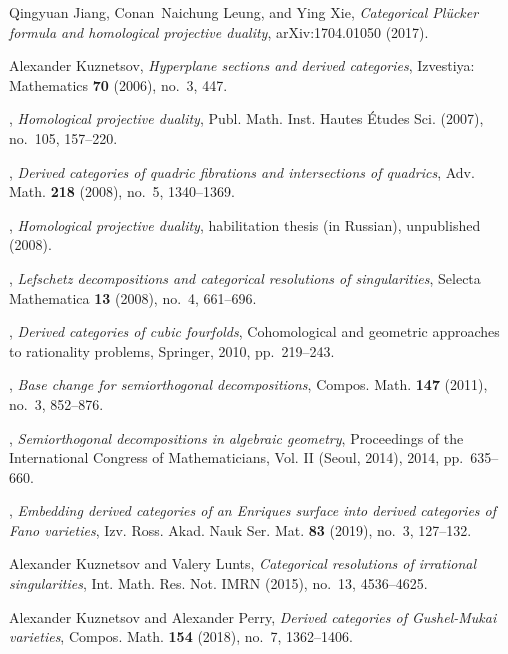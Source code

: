 \documentclass[11pt, reqno]{amsart}
\numberwithin{equation}{section}
\theoremstyle{plain}
\theoremstyle{definition}
\begin{document}
\begin{thebibliography}{10}
Qingyuan Jiang, Conan~Naichung Leung, and Ying Xie, \emph{Categorical
  {P}l{\"u}cker formula and homological projective duality}, arXiv:1704.01050
  (2017).

Alexander Kuznetsov, \emph{{Hyperplane sections and derived categories}},
  Izvestiya: Mathematics \textbf{70} (2006), no.~3, 447.

\bysame, \emph{Homological projective duality}, Publ. Math. Inst. Hautes
  \'Etudes Sci. (2007), no.~105, 157--220.

\bysame, \emph{Derived categories of quadric fibrations and intersections of
  quadrics}, Adv. Math. \textbf{218} (2008), no.~5, 1340--1369.

\bysame, \emph{Homological projective duality}, habilitation thesis (in
  Russian), unpublished (2008).

\bysame, \emph{{Lefschetz decompositions and categorical resolutions of
  singularities}}, Selecta Mathematica \textbf{13} (2008), no.~4, 661--696.

\bysame, \emph{{Derived categories of cubic fourfolds}}, {Cohomological and
  geometric approaches to rationality problems}, Springer, 2010, pp.~219--243.

\bysame, \emph{Base change for semiorthogonal decompositions}, Compos. Math.
  \textbf{147} (2011), no.~3, 852--876.

\bysame, \emph{Semiorthogonal decompositions in algebraic geometry},
  Proceedings of the {I}nternational {C}ongress of {M}athematicians, {V}ol.
  {II} ({S}eoul, 2014), 2014, pp.~635--660.

\bysame, \emph{Embedding derived categories of an {E}nriques surface into
  derived categories of {F}ano varieties}, Izv. Ross. Akad. Nauk Ser. Mat.
  \textbf{83} (2019), no.~3, 127--132.

Alexander Kuznetsov and Valery Lunts, \emph{Categorical resolutions of
  irrational singularities}, Int. Math. Res. Not. IMRN (2015), no.~13,
  4536--4625.

Alexander Kuznetsov and Alexander Perry, \emph{Derived categories of
  {G}ushel-{M}ukai varieties}, Compos. Math. \textbf{154} (2018), no.~7,
  1362--1406.


\end{thebibliography}
\end{document}

